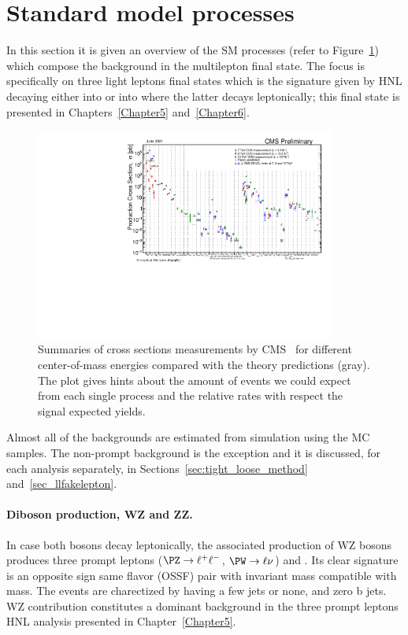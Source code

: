 \section{Standard model processes}\label{sec:c4sm}
In this section it is given an overview of the SM processes (refer to Figure~\ref{fig:crosssection}) which
compose the background in the multilepton final state. The focus is
specifically on three light leptons final states which is the
signature given by HNL decaying either into \PZ or into \PW where the latter
decays leptonically; this final state is presented in
Chapters~\ref{Chapter5} and~\ref{Chapter6}.
\begin{figure}[h]
\centering
  \includegraphics[width=0.88\textwidth]{Figures/c4/SigmaNew_v0.pdf}
  \caption{Summaries of cross sections measurements by CMS~\cite{cmspublic} for
    different center-of-mass energies compared with the theory
    predictions (gray). The plot gives hints about the
    amount of events we could expect from each single process and the
    relative rates with respect the signal expected yields.}
  \label{fig:crosssection}
\end{figure}

Almost all of the backgrounds are estimated from simulation using the
MC samples. The non-prompt background is the exception and it is
discussed, for each analysis separately, in Sections~\ref{sec:tight_loose_method}
and~\ref{sec_llfakelepton}. 

\paragraph{Diboson production, WZ and ZZ.}\label{sec:c4wz_zz}
In case both bosons decay leptonically, the associated production of
WZ bosons produces three prompt leptons ($\PZ \rightarrow \ell^{+}
\ell^{-}$, $\PW \rightarrow \ell \nu$) and \ptmiss.
Its clear signature is an opposite sign same flavor (OSSF) pair with
invariant mass compatible with \PZ mass. The events are charectized by
having a few jets or none, and zero b jets.
WZ contribution
constitutes a dominant background in the three prompt leptons HNL
analysis presented in Chapter~\ref{Chapter5}.

